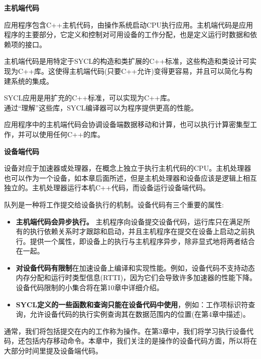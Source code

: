 \hspace*{\fill} \par %
\textbf{主机端代码}

应用程序包含C++主机代码，由操作系统启动CPU执行应用。主机端代码是应用程序的主要部分，它定义和控制对可用设备的工作分配，也是定义运行时数据和依赖项的接口。\par

主机端代码是用特定于SYCL的构造和类扩展的C++标准，这些构造和类设计可实现为C++库。这使得主机端代码(只要C++允许)变得更容易，并且可以简化与构建系统的集成。\par

\begin{tcolorbox}[colback=red!5!white,colframe=red!75!black]
SYCL应用是用扩充的C++标准，可以实现为C++库。\\
通过“理解”这些库，SYCL编译器可以为程序提供更高的性能。
\end{tcolorbox}

应用程序中的主机端代码会协调设备端数据移动和计算，也可以执行计算密集型工作，并可以使用任何C++的库。\par

\hspace*{\fill} \par %
\textbf{设备端代码}

设备对应于加速器或处理器，在概念上独立于执行主机代码的CPU。主机处理器也可以作为一个设备，如本章后面所述，但是主机处理器和设备应该是逻辑上相互独立的。主机处理器运行本机C++代码，而设备运行设备端代码。\par

队列是一种将工作提交给设备执行的机制。设备代码有三个重要的属性:\par

\begin{itemize}
	\item \textbf{主机端代码会异步执行。} 主机程序向设备提交设备代码，运行库只在满足所有的执行依赖关系时才跟踪和启动，并且主机程序在提交在设备上启动之前执行。提供一个属性，即设备上的执行与主机程序异步，除非显式地将两者结合在一起。
	\item \textbf{对设备代码有限制}在加速设备上编译和实现性能。例如，设备代码不支持动态内存分配和运行时类型信息(RTTI)，因为它们会导致许多加速器的性能下降。设备代码限制的小集合将在第10章中详细介绍。
	\item \textbf{SYCL定义的一些函数和查询只能在设备代码中使用}，例如：工作项标识符查询，允许设备代码的执行实例查询其在数据范围内的位置(在第4章中描述)。
\end{itemize}

通常，我们将包括提交在内的工作称为操作。在第3章中，我们将学习执行设备代码，还包括内存移动命令。本章中，我们关注的是操作的设备代码方面，所以将在大部分时间里提及设备端代码。\par


